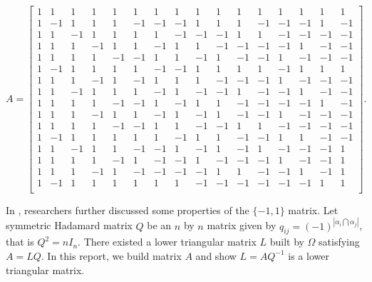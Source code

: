 \documentclass[11pt]{article}
\begin{document}
$$A = 
\left[\begin{smallmatrix}
    1 & 1 & 1 & 1 & 1 & 1 & 1 & 1 & 1 & 1 & 1 & 1 & 1 & 1 & 1 & 1 \\
    1 & -1 & 1  & 1  & 1  & -1 & -1 & -1 & 1  & 1  & 1  & -1 & -1 & -1 & 1  & -1 \\
    1 & 1  & -1 & 1  & 1  & 1  & 1  & -1 & -1 & -1 & 1  & 1  & -1 & -1 & -1 & -1 \\
    1 & 1  & 1  & -1 & 1  & 1  & -1 & 1  & 1  & -1 & -1 & -1 & -1 & 1  & -1 & -1 \\
    1 & 1  & 1  & 1  & -1 & -1 & 1  & 1  & -1 & 1  & -1 & -1 & 1  & -1 & -1 & -1 \\
    1 & -1 & 1  & 1  & 1  & 1  & -1 & -1 & 1  & 1  & 1  & 1  & -1 & 1  & 1  & 1  \\
    1 & 1  & 1  & -1 & 1  & -1 & 1  & 1  & 1  & -1 & -1 & -1 & 1  & -1 & -1 & -1 \\
    1 & 1  & -1 & 1  & 1  & 1  & -1 & 1  & -1 & -1 & 1  & -1 & -1 & 1  & -1 & -1 \\
    1 & 1  & 1  & 1  & -1 & -1 & 1  & -1 & 1  & 1  & -1 & -1 & -1 & -1 & 1  & -1 \\
    1 & 1  & 1  & -1 & 1  & 1  & -1 & 1  & -1 & 1  & -1 & -1 & 1  & -1 & -1 & -1 \\
    1 & 1  & 1  & 1  & -1 & -1 & 1  & 1  & -1 & -1 & 1  & 1  & -1 & -1 & -1 & -1 \\
    1 & -1 & 1  & 1  & 1  & 1  & 1  & -1 & 1  & 1  & -1 & -1 & 1  & 1  & -1 & -1 \\
    1 & 1  & -1 & 1  & 1  & -1 & -1 & 1  & -1 & 1  & -1 & 1  & -1 & -1 & -1 & 1  \\
    1 & 1  & 1  & 1  & -1 & 1  & -1 & -1 & 1  & -1 & -1 & -1 & 1  & -1 & -1 & 1  \\
    1 & 1  & 1  & -1 & 1  & -1 & -1 & -1 & -1 & 1  & 1  & -1 & -1 & 1  & -1 & 1  \\
    1 & -1 & 1  & 1  & 1  & 1  & 1  & 1  & -1 & -1 & -1 & -1 & -1 & -1 & 1  & 1  \\
\end{smallmatrix}\right].
$$

In \cite{ALON1997133}, researchers further discussed some properties of the $\{-1, 1\}$ matrix. Let symmetric Hadamard matrix $Q$ be an $n$ by $n$ matrix given by $q_{ij} = (-1)^{|\alpha_i\bigcap\alpha_j|}$, that is $Q^2 = nI_n$. There existed a lower triangular matrix $L$ built by $\Omega$ satisfying $A=LQ$. In this report, we build matrix $A$ and show
$L = AQ^{-1}$ is a lower triangular matrix.
\end{document}
